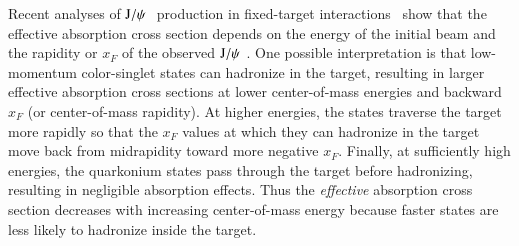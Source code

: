 


Recent analyses of $\mathrm{J}/\psi\hspace {0.05in}$ production
in fixed-target interactions~\cite{Lourenco:2008sk} 
show that the effective absorption
cross section depends on the energy of the initial beam and the rapidity or
$x_F$ of the observed $\mathrm{J}/\psi\hspace {0.05in}$.  One possible interpretation is that 
low-momentum color-singlet states can hadronize in the
target, resulting in larger effective absorption cross sections at lower
center-of-mass energies and backward $x_F$ (or center-of-mass rapidity).
At higher energies, the states traverse the target more rapidly so that
the $x_F$ values at which they can hadronize in the target move 
back from midrapidity toward more negative $x_F$.
Finally, at sufficiently high energies, the quarkonium states pass 
through the target before hadronizing, resulting in negligible absorption
effects.  Thus the {\it effective} absorption cross section decreases with 
increasing center-of-mass energy because faster states are less likely 
to hadronize inside the target.

